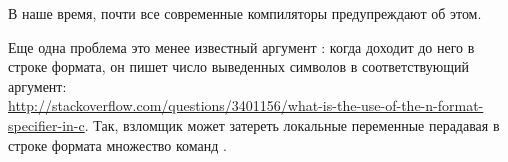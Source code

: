 В наше время, почти все современные компиляторы предупреждают об этом.

Еще одна проблема это менее известный аргумент \printf {}: когда \printf доходит до него в строке формата,
он пишет число выведенных символов в соответствующий аргумент:\\
\url{http://stackoverflow.com/questions/3401156/what-is-the-use-of-the-n-format-specifier-in-c}.
Так, взломщик может затереть локальные переменные перадавая в строке формата множество команд .

